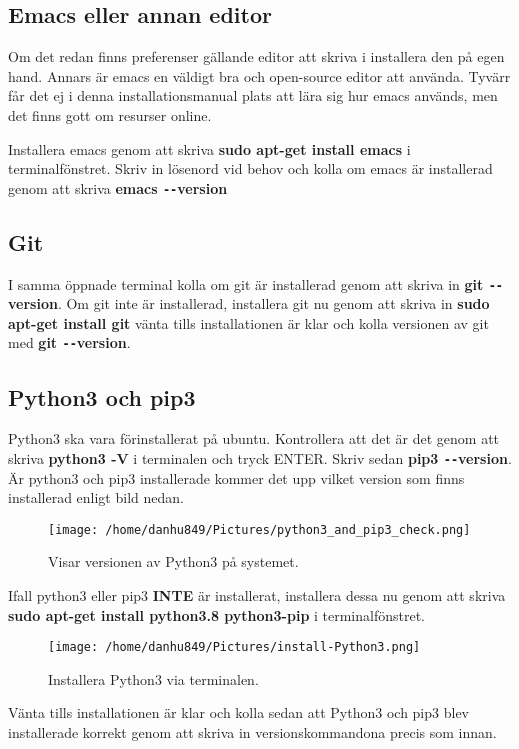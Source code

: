 \documentclass{TDP003mall}
\begin{document}
\subsection{Emacs eller annan editor}
Om det redan finns preferenser gällande editor att skriva i installera den på egen hand. Annars är emacs en väldigt bra och open-source editor att använda. Tyvärr får det ej i denna installationsmanual plats att lära sig hur emacs används, men det finns gott om resurser online.

Installera emacs genom att skriva \textbf{sudo apt-get install emacs} i terminalfönstret. Skriv in lösenord vid behov och kolla om emacs är installerad genom att skriva \textbf{emacs \texttt{-{}-}version}

\subsection{Git}
I samma öppnade terminal kolla om git är installerad genom att skriva in \textbf{git \texttt{-{}-}version}. Om git inte är installerad, installera git nu genom att skriva in \textbf{sudo apt-get install git} vänta tills installationen är klar och kolla versionen av git med \textbf{git \texttt{-{}-}version}.

\subsection{Python3 och pip3}
Python3 ska vara förinstallerat på ubuntu. Kontrollera att det är det genom att skriva \textbf{python3 -V} i terminalen och tryck ENTER. Skriv sedan \textbf{pip3 \texttt{-{}-}version}. Är python3 och pip3 installerade kommer det upp vilket version som finns installerad enligt bild nedan.
\begin{figure}[h]
  \centerline{\texttt{[image: /home/danhu849/Pictures/python3\_and\_pip3\_check.png]}}
  \caption{Visar versionen av Python3 på systemet.}
  \label{fig}
\end{figure}

Ifall python3 eller pip3 \textbf{INTE} är installerat, installera dessa nu genom att skriva \textbf{sudo apt-get install python3.8 python3-pip} i terminalfönstret.
\begin{figure}[h]
  \centerline{\texttt{[image: /home/danhu849/Pictures/install-Python3.png]}}
  \caption{Installera Python3 via terminalen.}
  \label{fig}
\end{figure}
Vänta tills installationen är klar och kolla sedan att Python3 och pip3 blev installerade korrekt genom att skriva in versionskommandona precis som innan.
\end{document}
